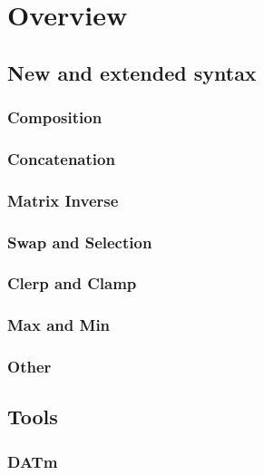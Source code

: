 \section{Overview}


\subsection{New and extended syntax}
\subsubsection{{\color{blue} Composition}}

\subsubsection{{\color{blue} Concatenation}}

\subsubsection{{\color{blue} Matrix Inverse}}

\subsubsection{{\color{blue} Swap and Selection}}

\subsubsection{{\color{blue} Clerp and Clamp}}

\subsubsection{{\color{blue} Max and Min}} 

%
\subsubsection{{\color{blue} Other}}


\subsection{Tools}
\subsubsection{{\color{blue} DATm}} 
